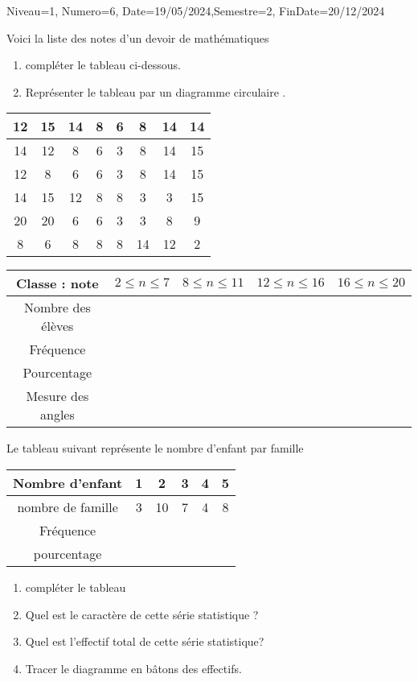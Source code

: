 \documentclass[a4paper,12pt]{article}
\begin{document}
\begin{Maquette}[DM]{Niveau=1, Numero=6, Date=19/05/2024,Semestre=2, FinDate=20/12/2024}


\begin{exercice}
\begin{minipage}{.6\linewidth}
Voici la liste des notes d'un devoir de mathématiques 
\begin{enumerate}
\item compléter le tableau ci-dessous.
\item Représenter le tableau par un diagramme circulaire .
\end{enumerate}
\end{minipage}
\begin{tabular}{c|c|c|c|c|c|c|c}
12 & 15 & 14 & 8 & 6 & 8 & 14 & 14	 \\ 
\hline 
14 & 12 & 8 & 6 & 3 & 8 & 14 & 15	 \\ 
\hline 
12 & 8 & 6 & 6 & 3 & 8 & 14 & 15	 \\ 
\hline 
14 & 15 & 12 & 8 & 8 & 3 & 3 & 15 \\ 
\hline 
20 & 20 & 6 & 6 & 3 & 3 & 8 & 9 \\ 
\hline 
8 & 6 & 8 & 8 & 8 & 14 & 12 & 2 \\ 
\end{tabular} 

\begin{tabular}{|c|c|c|c|c|}
\hline 
Classe : note  & $2\leq n \leq 7$ & $8\leq n \leq 11$ &$12\leq n \leq 16$ & $16\leq n \leq 20$ \\ 
\hline 
Nombre des élèves &  &  &  &  \\ 
\hline 
Fréquence&  &  &  &  \\ 
\hline 
Pourcentage &  &  &  &  \\ 
\hline 
Mesure des angles &  &  &  &  \\ 
\hline 
\end{tabular} 
\end{exercice}

\begin{exercice}
Le tableau suivant représente le nombre d'enfant par famille

\begin{tabular}{|c|c|c|c|c|c|}
\hline 
Nombre d'enfant & 1 & 2 & 3 & 4 & 5 \\ 
\hline 
nombre de famille & 3 & 10 & 7 & 4 & 8 \\ 
\hline 
Fréquence  &  &  &  &  &  \\ 
\hline 
pourcentage &  &  &  &  &  \\ 
\hline 
\end{tabular} 
\begin{enumerate}
\item compléter le tableau
\item Quel est le caractère de cette série statistique ?
\item Quel est l'effectif total de cette série statistique?
\item Tracer le diagramme en bâtons des effectifs.
\end{enumerate}
\end{exercice}



\end{Maquette}
\end{document}
